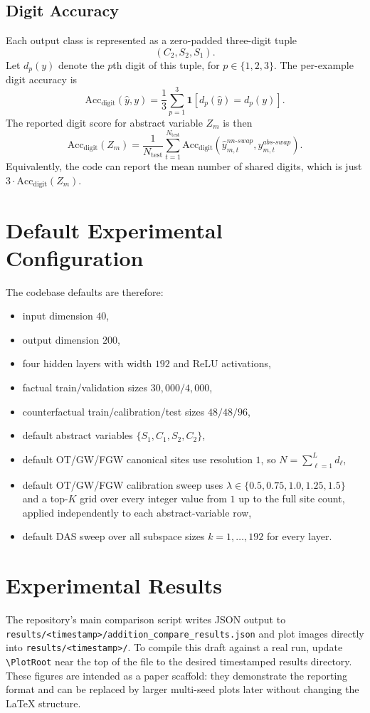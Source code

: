 \documentclass[11pt]{article}
\begin{document}
\subsection{Digit Accuracy}
Each output class is represented as a zero-padded three-digit tuple
\[
(C_2, S_2, S_1).
\]
Let $d_p(y)$ denote the $p$th digit of this tuple, for $p \in \{1,2,3\}$. The per-example digit accuracy is
\[
\mathrm{Acc}_{\mathrm{digit}}(\widehat{y}, y)
=
\frac{1}{3}
\sum_{p=1}^{3}
\mathbf{1}\!\left[d_p(\widehat{y}) = d_p(y)\right].
\]
The reported digit score for abstract variable $Z_m$ is then
\[
\mathrm{Acc}_{\mathrm{digit}}(Z_m)
=
\frac{1}{N_{\mathrm{test}}}
\sum_{t=1}^{N_{\mathrm{test}}}
\mathrm{Acc}_{\mathrm{digit}}\!\left(\widehat{y}_{m,t}^{nn\text{-}swap}, y_{m,t}^{abs\text{-}swap}\right).
\]
Equivalently, the code can report the mean number of shared digits, which is just $3 \cdot \mathrm{Acc}_{\mathrm{digit}}(Z_m)$.

\section{Default Experimental Configuration}
The codebase defaults are therefore:
\begin{itemize}[leftmargin=1.5em]
\item input dimension $40$,
\item output dimension $200$,
\item four hidden layers with width $192$ and ReLU activations,
\item factual train/validation sizes $30{,}000 / 4{,}000$,
\item counterfactual train/calibration/test sizes $48 / 48 / 96$,
\item default abstract variables $\{S_1,C_1,S_2,C_2\}$,
\item default OT/GW/FGW canonical sites use resolution $1$, so $N = \sum_{\ell=1}^{L} d_\ell$,
\item default OT/GW/FGW calibration sweep uses $\lambda \in \{0.5, 0.75, 1.0, 1.25, 1.5\}$ and a top-$K$ grid over every integer value from $1$ up to the full site count, applied independently to each abstract-variable row,
\item default DAS sweep over all subspace sizes $k=1,\dots,192$ for every layer.
\end{itemize}

\section{Experimental Results}
The repository's main comparison script writes JSON output to
\texttt{results/<timestamp>/addition\_compare\_results.json} and plot images
directly into \texttt{results/<timestamp>/}. To compile this draft against a
real run, update \texttt{\textbackslash PlotRoot} near the top of the file to
the desired timestamped results directory. These figures are intended as a
paper scaffold: they demonstrate the reporting format and can be replaced by
larger multi-seed plots later without changing the LaTeX structure.
\end{document}

